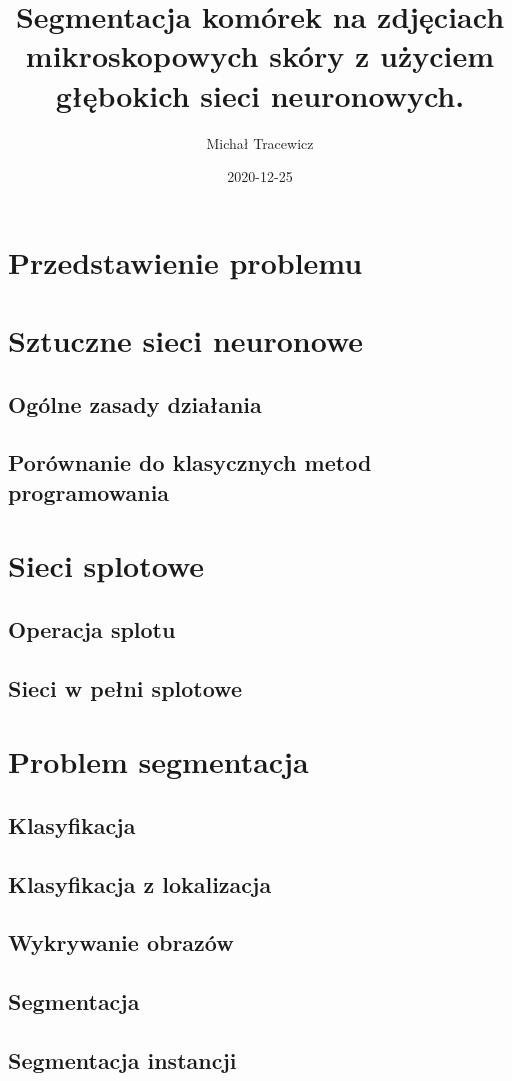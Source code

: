 \documentclass{article}
\title{Segmentacja komórek na zdjęciach mikroskopowych skóry z użyciem głębokich sieci neuronowych.}
\date{2020-12-25}
\author{Michał Tracewicz}
\begin{document}
\maketitle
\newpage
\tableofcontents
\newpage
\section{Przedstawienie problemu}
\section{Sztuczne sieci neuronowe}
\subsection{Ogólne zasady działania}
\subsection{Porównanie do klasycznych metod programowania}
\section{Sieci splotowe}
\subsection{Operacja splotu}
\subsection{Sieci w pełni splotowe}
\section{Problem segmentacja}
\subsection{Klasyfikacja}
\subsection{Klasyfikacja z lokalizacja}
\subsection{Wykrywanie obrazów}
\subsection{Segmentacja}
\subsection{Segmentacja instancji}
\end{document}
